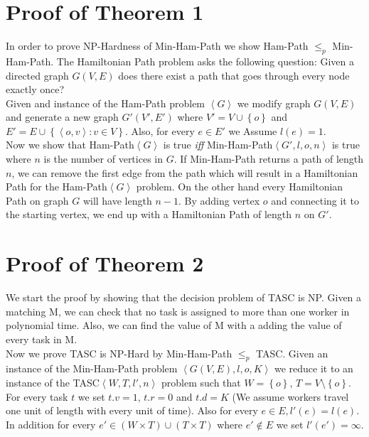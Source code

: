 \appendix

\begin{appendices}

\section{Proof of Theorem 1}
\label{app:MinHamProof}
In order to prove NP-Hardness of Min-Ham-Path we show Ham-Path $\leq_p$ Min-Ham-Path. The Hamiltonian Path problem asks the following question: Given a directed graph $G(V,E)$ does there exist a path that goes through every node exactly once?\\

Given and instance of the Ham-Path problem $\left\langle G \right\rangle$ we modify graph $G(V,E)$ and generate a new graph $G'(V', E')$ where $V' = V \cup \left\{ o \right\}$ and $E' = E \cup \left\{ \left\langle o, v \right\rangle : v \in V \right\}$. Also, for every $e \in E'$ we Assume $l(e) = 1$.\\

Now we show that Ham-Path$\left\langle G \right\rangle$ is true \emph{iff} Min-Ham-Path$\left\langle G', l, o, n \right\rangle$ is true where $n$ is the number of vertices in $G$. If Min-Ham-Path returns a path of length $n$, we can remove the first edge from the path which will result in a Hamiltonian Path for the Ham-Path$\left\langle G \right\rangle$ problem. On the other hand every Hamiltonian Path on graph $G$ will have length $n-1$. By adding vertex $o$ and connecting it to the starting vertex, we end up with a Hamiltonian Path of length $n$ on $G'$.

\section{Proof of Theorem 2}
\label{app:TASCProof}
We start the proof by showing that the decision problem of TASC is NP. Given a matching M, we can check that no task is assigned to more than one worker in polynomial time. Also, we can find the value of M with a adding the value of every task in M.\\

Now we prove TASC is NP-Hard by Min-Ham-Path $\leq_p$ TASC. Given an instance of the Min-Ham-Path problem $\left\langle G(V,E), l, o, K \right\rangle$ we reduce it to an instance of the TASC$\left\langle W, T, l', n \right\rangle$ problem such that $W = \left\{ o \right\}$, $T = V \setminus \left\{ o \right\}$. For every task $t$ we set $t.v = 1$, $t.r = 0$ and $t.d = K$ (We assume workers travel one unit of length with every unit of time). Also for every $e \in E, l'(e) = l(e)$. In addition for every $e' \in \left( W \times T \right) \cup \left( T \times T \right) $ where $e' \not\in E$ we set $l'(e') = \infty$.\\ 


\end{appendices}
